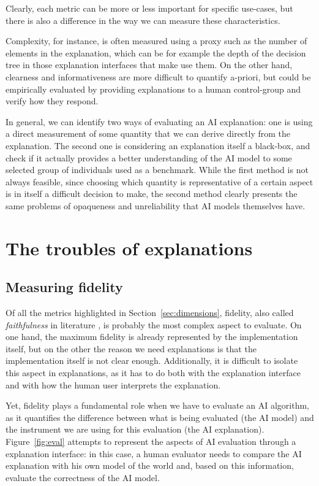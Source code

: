 \documentclass[conference]{IEEEtran}
\newcommand{\cit}[1][]{\todo[tickmarkheight=0.2cm]{cit #1}}
\begin{document}
Clearly, each metric can be more or less important for specific use-cases, but there is also a difference in the way we can measure these characteristics.

Complexity, for instance, is often measured using a proxy such as the number of elements in the explanation, which can be for example the depth of the decision tree in those explanation interfaces that make use them. On the other hand, clearness and informativeness are more difficult to quantify a-priori, but could be empirically evaluated by providing explanations to a human control-group and verify how they respond.

In general, we can identify two ways of evaluating an AI explanation: one is using a direct measurement of some quantity that we can derive directly from the explanation. The second one is considering an explanation itself a black-box, and check if it actually provides a better understanding of the AI model to some selected group of individuals used as a benchmark.
While the first method is not always feasible, since choosing which quantity is representative of a certain aspect is in itself a difficult decision to make, the second method clearly presents the same problems of opaqueness and unreliability that AI models themselves have.


\section{The troubles of explanations}
\label{sec:troubles}

\subsection{Measuring fidelity}
\label{sec:fidelity}

Of all the metrics highlighted in Section~\ref{sec:dimensions}, fidelity, also called \textit{faithfulness} in literature \cit , is probably the most complex aspect to evaluate. On one hand, the maximum fidelity is already represented by the implementation itself, but on the other the reason we need explanations is that the implementation itself is not clear enough. Additionally, it is difficult to isolate this aspect in explanations, as it has to do both with the explanation interface and with how the human user interprets the explanation.

Yet, fidelity plays a fundamental role when we have to evaluate an AI algorithm, as it quantifies the difference between what is being evaluated (the AI model) and the instrument we are using for this evaluation (the AI explanation).
Figure~\ref{fig:eval} attempts to represent the aspects of AI evaluation through a explanation interface: in this case, a human evaluator needs to compare the AI explanation with his own model of the world and, based on this information, evaluate the correctness of the AI model.
\end{document}
